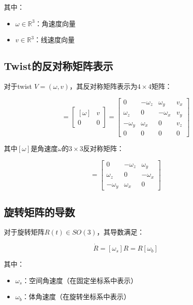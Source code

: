 \documentclass[12pt,a4paper]{article}
\begin{document}
其中：
\begin{itemize}
\item $\omega \in \mathbb{R}^3$：角速度向量
\item $v \in \mathbb{R}^3$：线速度向量
\end{itemize}

\subsection{Twist的反对称矩阵表示}

对于twist $V = (\omega, v)$，其反对称矩阵表示为$4 \times 4$矩阵：

\begin{equation}
[V] = \begin{bmatrix}
[\omega] & v \\
0 & 0
\end{bmatrix} = \begin{bmatrix}
0 & -\omega_z & \omega_y & v_x \\
\omega_z & 0 & -\omega_x & v_y \\
-\omega_y & \omega_x & 0 & v_z \\
0 & 0 & 0 & 0
\end{bmatrix}
\label{eq:V_bracket}
\end{equation}

其中$[\omega]$是角速度$\omega$的$3 \times 3$反对称矩阵：

\begin{equation}
[\omega] = \begin{bmatrix}
0 & -\omega_z & \omega_y \\
\omega_z & 0 & -\omega_x \\
-\omega_y & \omega_x & 0
\end{bmatrix}
\end{equation}

\subsection{旋转矩阵的导数}

对于旋转矩阵$R(t) \in SO(3)$，其导数满足：

\begin{equation}
\dot{R} = [\omega_s] R = R [\omega_b]
\label{eq:R_dot}
\end{equation}

其中：
\begin{itemize}
\item $\omega_s$：空间角速度（在固定坐标系中表示）
\item $\omega_b$：体角速度（在旋转坐标系中表示）
\end{itemize}
\end{document}
